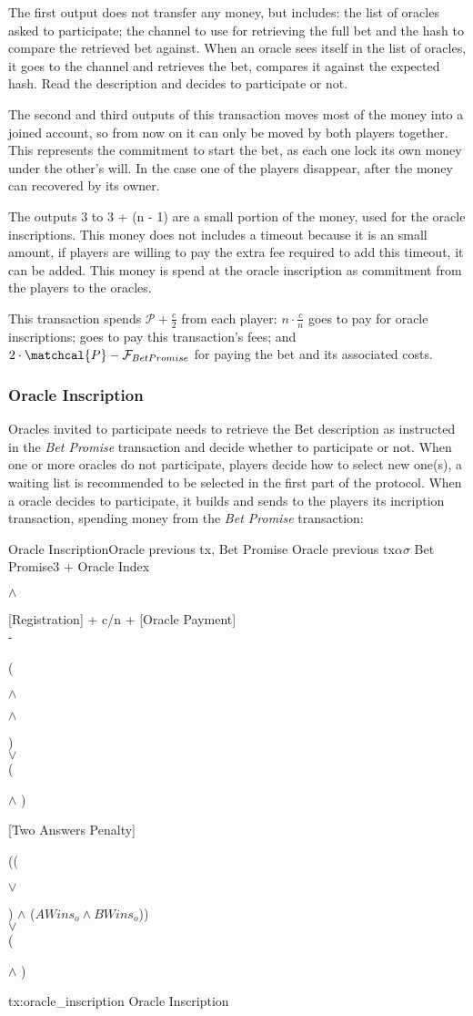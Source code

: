 The first output does not transfer any money, but includes: the list of oracles
  asked to participate; the channel to use for retrieving the full bet and the
  hash to compare the retrieved bet against.
When an oracle sees itself in the list of oracles, it goes to the channel and
  retrieves the bet, compares it against the expected hash.
Read the description and decides to participate or not.

The second and third outputs of this transaction moves most of the money into
  a joined account, so from now on it can only be moved by both players
  together.
This represents the commitment to start the bet, as each one lock its own money
  under the other's will.
In the case one of the players disappear, after  the money can
  recovered by its owner.

The outputs 3 to 3 + (n - 1) are a small portion of the money, used for the
  oracle inscriptions.
This money does not includes a timeout because it is an small amount, if players
  are willing to pay the extra fee required to add this timeout, it can be
  added.
This money is spend at the oracle inscription as commitment from the players to
  the oracles.

This transaction spends $\mathcal{P} + \frac{c}{2}$ from each player:
  $ n \cdot \frac{c}{n}$ goes to pay for oracle inscriptions; 
  goes to pay this transaction's fees; and
  $2 \cdot \matchcal{P} - \fee{Bet Promise} $ for paying the bet and its
  associated costs.

\subsubsection{Oracle Inscription}
Oracles invited to participate needs to retrieve the Bet description as
  instructed in the \textit{Bet Promise} transaction and decide whether to
  participate or not.
When one or more oracles do not participate, players decide how to select new
  one(s), a waiting list is recommended to be selected in the first part of the
  protocol.
When a oracle decides to participate, it builds and sends to the players its
  incription transaction, spending money from the \textit{Bet Promise}
  transaction:

\transaction
    {Oracle Inscription}{Oracle previous tx, Bet Promise}
    {Oracle previous tx}{$\alpha$}{$\sigma$}
    {Bet Promise}{3 + Oracle Index}{\signature{A} $\wedge$ \signature{B}}
    \stopinputs
    {[Registration] + c/n + [Oracle Payment] \\ - }
        {(\signature{Oracle} $\wedge$ \signature{A} $\wedge$ \signature{B}) \\
            $\vee$ \\
         (\signature{Oracle} $\wedge$ )}
    {[Two Answers Penalty]}{((\signature{A} $\vee$ \signature{B}) $\wedge$ %
                             ($AWins_o \wedge BWins_o$)) \\
                           $\vee$ \\
                       (\signature{Oracle} $\wedge$ )}
    \stopoutputs
    {tx:oracle_inscription}
    {Oracle Inscription}

